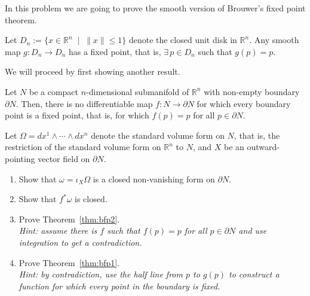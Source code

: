\begin{exercise}
In this problem we are going to prove the smooth version of Brouwer's fixed point theorem.
  
\begin{theorem}\label{thm:bfp1}
  Let $D_n:=\{x\in\mathbb{R}^n\;\mid\;\|x\|\leq 1\}$ denote the closed unit disk in $\mathbb{R}^n$. %
  Any smooth map $g: D_n \to D_n$ has a fixed point, that is, $\exists\,p\in D_n$ such that $g(p) = p$.
\end{theorem}

We will proceed by first showing another result.

\begin{theorem}\label{thm:bfp2}
  Let $N$ be a compact $n$-dimensional submanifold of $\mathbb{R}^n$ with non-empty boundary $\partial N$.
  Then, there is no differentiable map $f: N \to \partial N$ for which every boundary point is a fixed point, that is, for which $f(p) = p$ for all $p\in\partial N$.
\end{theorem}

Let $\Omega = dx^1 \wedge \cdots\wedge dx^n$ denote the standard volume form on $N$, that is, the restriction of the standard volume form on $\mathbb{R}^n$ to $N$,
and $X$ be an outward-pointing vector field on $\partial N$.

\begin{enumerate}
  \item Show that $\omega = \iota_X \Omega$ is a closed non-vanishing form on $\partial N$.
  \item Show that $f^*\omega$ is closed.
  \item Prove Theorem~\ref{thm:bfp2}.\\\textit{Hint: assume there is $f$ such that $f(p)=p$ for all $p\in \partial N$ and use integration to get a contradiction.}
  \item Prove Theorem~\ref{thm:bfp1}.\\\textit{Hint: by contradiction, use the half line from $p$ to $g(p)$ to construct a function for which every point in the boundary is fixed. }
\end{enumerate}
\end{exercise}
